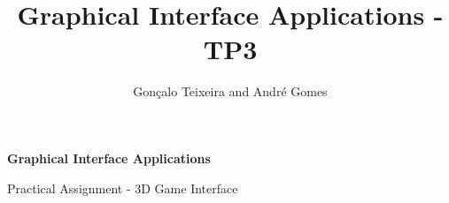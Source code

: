 \documentclass[11pt,a4paper]{article}
\author{Gonçalo Teixeira and André Gomes}
\title{Graphical Interface Applications - TP3}
\begin{document}
\begin{center}
    \Huge
    \textbf{Graphical Interface Applications}

    \vspace{0.5cm}
    \LARGE
     Practical Assignment - 3D Game Interface
\end{center}



\end{document}
